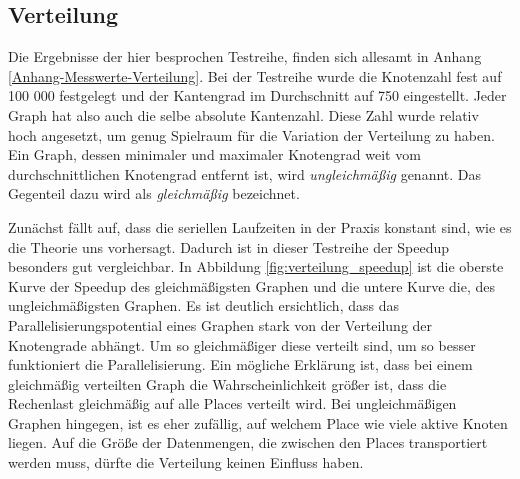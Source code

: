 \subsection{Verteilung} %
\label{sub:verteilung}
Die Ergebnisse der hier besprochen Testreihe, finden sich allesamt in Anhang \ref{Anhang-Messwerte-Verteilung}. Bei der Testreihe wurde die Knotenzahl fest auf 100 000 festgelegt und der Kantengrad im Durchschnitt auf 750 eingestellt. Jeder Graph hat also auch die selbe absolute Kantenzahl. Diese Zahl wurde relativ hoch angesetzt, um genug Spielraum für die Variation der Verteilung zu haben. Ein Graph, dessen minimaler und maximaler Knotengrad weit vom durchschnittlichen Knotengrad entfernt ist, wird \textit{ungleichmäßig} genannt. Das Gegenteil dazu wird als \textit{gleichmäßig} bezeichnet. 

Zunächst fällt auf, dass die seriellen Laufzeiten in der Praxis konstant sind, wie es die Theorie uns vorhersagt. Dadurch ist in dieser Testreihe der Speedup besonders gut vergleichbar. In Abbildung \ref{fig:verteilung_speedup} ist die oberste Kurve der Speedup des gleichmäßigsten Graphen und die untere Kurve die, des ungleichmäßigsten Graphen. Es ist deutlich ersichtlich, dass das Parallelisierungspotential eines Graphen stark von der Verteilung der Knotengrade abhängt. Um so gleichmäßiger diese verteilt sind, um so besser funktioniert die Parallelisierung. Ein mögliche Erklärung ist, dass bei einem gleichmäßig verteilten Graph die Wahrscheinlichkeit größer ist, dass die Rechenlast gleichmäßig auf alle Places verteilt wird. Bei ungleichmäßigen Graphen hingegen, ist es eher zufällig, auf welchem Place wie viele aktive Knoten liegen. Auf die Größe der Datenmengen, die zwischen den Places transportiert werden muss, dürfte die Verteilung keinen Einfluss haben.

